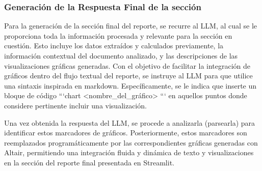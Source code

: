 \subsubsection{Generación de la Respuesta Final de la sección}

Para la generación de la sección final del reporte, se recurre al LLM, al cual se le proporciona toda la información procesada y relevante para la sección en cuestión. Esto incluye los datos extraídos y calculados previamente, la información contextual del documento analizado, y las descripciones de las visualizaciones gráficas generadas. Con el objetivo de facilitar la integración de gráficos dentro del flujo textual del reporte, se instruye al LLM para que utilice una sintaxis inspirada en markdown. Específicamente, se le indica que inserte un bloque de código ```chart <nombre\_del\_gráfico> ``` en aquellos puntos donde considere pertinente incluir una visualización.

Una vez obtenida la respuesta del LLM, se procede a analizarla (parsearla) para identificar estos marcadores de gráficos. Posteriormente, estos marcadores son reemplazados programáticamente por las correspondientes gráficas generadas con Altair, permitiendo una integración fluida y dinámica de texto y visualizaciones en la sección del reporte final presentada en Streamlit.

